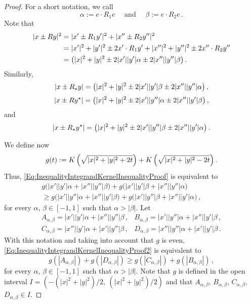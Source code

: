 \begin{proof}
For a short notation, we call
$$
\alpha := e \cdot R_1 e  \quad \text{ and } \quad \beta := e \cdot R_2 e\,.
$$
Note that
\begin{align*}
|x \pm Ry|^2&= |x' \pm R_1y'|^2 + |x'' \pm R_2y''|^2 \\
&= |x'|^2 + |y'|^2 \pm 2 x'\cdot R_1 y' +  |x''|^2 + |y''|^2 \pm 2 x''\cdot R_2 y''\\
&= \left ( { |x|^2 + |y|^2 \pm 2 |x'||y'| \alpha \pm 2 |x''||y''| \beta}\right ).
\end{align*}
Similarly,
$$
|x \pm R_\star y| = \left ( { |x|^2 + |y|^2 \pm 2 |x'||y'| \beta \pm 2 |x''||y''|\alpha}\right ),
$$
$$
|x \pm R y^\star| = \left ( { |x|^2 + |y|^2 \pm 2 |x'||y''| \alpha \pm 2 |x''||y'|\beta}\right ),
$$
and
$$
|x \pm R_\star y^\star| = \left ( { |x|^2 + |y|^2 \pm 2 |x'||y''| \beta \pm 2 |x''||y'| \alpha}\right ).
$$

We define now
$$
g(t) := K \left ( {\sqrt{|x|^2 + |y|^2 + 2 t}}\right ) + K \left ( {\sqrt{|x|^2 + |y|^2 - 2 t}}\right ).
$$
Thus, \eqref{Eq:InequalityIntegrandKernelInequalityProof} is equivalent to
\begin{equation}
\label{Eq:InequalityIntegrandKernelInequalityProof2}
\begin{split}
g\Big(|x'||y'| \alpha + |x''||y''| \beta \Big)
+ g\Big(|x'||y'| \beta + |x''||y''| \alpha \Big) \hspace{2cm}
\\ \geq
g\Big(|x'||y''| \alpha + |x''||y'|\beta \Big)
+ g\Big(|x'||y''| \beta + |x''||y'| \alpha \Big)\,,
\end{split}
\end{equation}
for every $\alpha$, $\beta \in [-1,1]$ such that $\alpha > |\beta|$. Let
$$
\begin{array}{cc}
A_{\alpha,\beta} = |x'||y'|  \alpha + |x''||y''|\beta \,, &
B_{\alpha,\beta} = |x'||y''| \alpha + |x''||y'| \beta \,, \\
C_{\alpha,\beta} = |x''||y'| \alpha + |x'||y''| \beta \,, &
D_{\alpha,\beta} = |x''||y''|\alpha + |x'||y'|  \beta \,.
\end{array}
$$
With this notation and taking into account that $g$ is even,
\eqref{Eq:InequalityIntegrandKernelInequalityProof2} is equivalent to
\begin{equation}
\label{Eq:InequalityIntegrandKernelInequalityProof3}
g(|A_{\alpha,\beta}|) + g(|D_{\alpha,\beta}|) \geq g(|C_{\alpha,\beta}|) + g(|B_{\alpha,\beta}|)\,,
\end{equation}
for every $\alpha$, $\beta \in [-1,1]$ such that $\alpha > |\beta|$. Note that $g$ is defined in the open interval $I = (-(|x|^2 + |y|^2)/2,\ (|x|^2 + |y|^2)/2)$ and that $A_{\alpha,\beta}$, $B_{\alpha,\beta}$, $C_{\alpha,\beta}$, $D_{\alpha,\beta} \in I$.


\end{proof}
